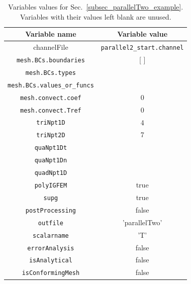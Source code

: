 \documentclass[11pt,letterpaper]{article}
\begin{document}
\begin{table}[!h]
\caption{Variables values for Sec.\ \ref{subsec_parallelTwo_example}. Variables with their values left blank are unused.}
\label{tab_parallelTwo1}
\centering
\begin{tabular}{|c|c|}
\hline
Variable name & Variable value\\
\hline
channelFile & \texttt{parallel2\_start.channel}\\
\hline
\texttt{mesh.BCs.boundaries} & [ ]\\
\hline
\texttt{mesh.BCs.types} &  \\
\hline
\texttt{mesh.BCs.values\_or\_funcs} & \\
\hline
\texttt{mesh.convect.coef} & 0\\
\hline
\texttt{mesh.convect.Tref} & 0 \\
\hline
\texttt{triNpt1D} & 4\\
\hline
\texttt{triNpt2D} & 7 \\
\hline
\texttt{quaNpt1Dt} & \\
\hline
\texttt{quaNpt1Dn} & \\
\hline
\texttt{quadNpt1D} & \\
\hline
\texttt{polyIGFEM} & true\\
\hline
\texttt{supg} & true \\
\hline
\texttt{postProcessing} & false \\
\hline 
\texttt{outfile} & 'parallelTwo' \\
\hline
\texttt{scalarname} & 'T' \\
\hline
\texttt{errorAnalysis} & false \\
\hline
\texttt{isAnalytical} & false\\
\hline
\texttt{isConformingMesh} & false \\
\hline
\end{tabular}
\end{table}
\end{document}
